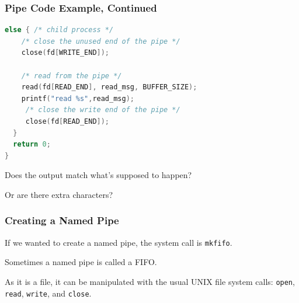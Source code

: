 \begin{frame}[fragile]
\frametitle{Pipe Code Example, Continued}


\begin{lstlisting}[language=C]
  else { /* child process */
    /* close the unused end of the pipe */ 
    close(fd[WRITE_END]);
    
    /* read from the pipe */
    read(fd[READ_END], read_msg, BUFFER_SIZE); 
    printf("read %s",read_msg);
     /* close the write end of the pipe */
     close(fd[READ_END]); 
  }
  return 0;
}
\end{lstlisting}

Does the output match what's supposed to happen? 

Or are there extra characters?

\end{frame}

\begin{frame}
\frametitle{Creating a Named Pipe}

If we wanted to create a named pipe, the system call is \texttt{mkfifo}. 

Sometimes a named pipe is called a FIFO. 

As it is a file, it can be manipulated with the usual UNIX file system calls: \texttt{open}, \texttt{read}, \texttt{write}, and \texttt{close}.

\end{frame}




